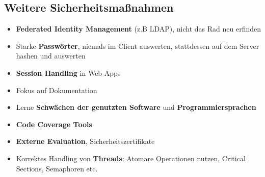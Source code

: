 \subsection{Weitere Sicherheitsmaßnahmen}
\label{sc:sub:weitere_sicherheitsmassnahmen}

\begin{itemize}
	\item \textbf{Federated Identity Management} (z.B LDAP), nicht das Rad neu erfinden
	\item Starke \textbf{Passwörter}, niemals im Client auswerten, stattdessen auf dem Server hashen und auswerten
	\item \textbf{Session Handling} in Web-Apps
	\item Fokus auf Dokumentation
	\item Lerne \textbf{Schwächen der genutzten Software} und \textbf{Programmiersprachen}
	\item \textbf{Code Coverage Tools}
	\item \textbf{Externe Evaluation}, Sicherheitszertifikate
	\item Korrektes Handling von \textbf{Threads}: Atomare Operationen nutzen, Critical Sections, Semaphoren etc.
\end{itemize}